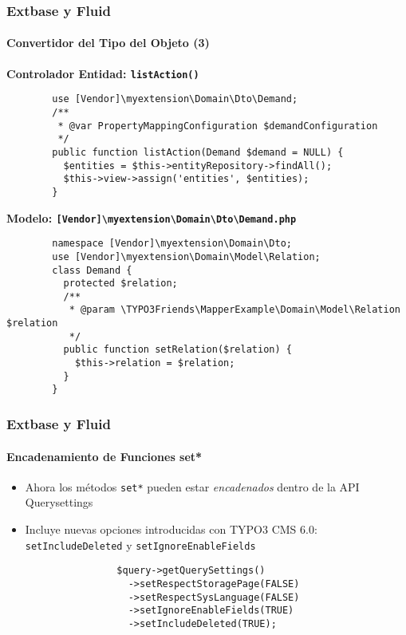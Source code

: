 \begin{frame}[fragile]
	\frametitle{Extbase y Fluid}
	\framesubtitle{Convertidor del Tipo del Objeto (3)}

	\lstset{
		basicstyle=\tiny\ttfamily
	}

	\smaller\textbf{Controlador Entidad: \texttt{listAction()}}\normalsize
	\begin{lstlisting}
		use [Vendor]\myextension\Domain\Dto\Demand;
		/**
		 * @var PropertyMappingConfiguration $demandConfiguration
		 */
		public function listAction(Demand $demand = NULL) {
		  $entities = $this->entityRepository->findAll();
		  $this->view->assign('entities', $entities);
		}
	\end{lstlisting}

	\smaller\textbf{Modelo: \texttt{[Vendor]\textbackslash myextension\textbackslash Domain\textbackslash Dto\textbackslash Demand.php}}\normalsize
	\begin{lstlisting}
		namespace [Vendor]\myextension\Domain\Dto;
		use [Vendor]\myextension\Domain\Model\Relation;
		class Demand {
		  protected $relation;
		  /**
		   * @param \TYPO3Friends\MapperExample\Domain\Model\Relation $relation
		   */
		  public function setRelation($relation) {
		    $this->relation = $relation;
		  }
		}
	\end{lstlisting}

\end{frame}


\begin{frame}[fragile]
	\frametitle{Extbase y Fluid}
	\framesubtitle{Encadenamiento de Funciones set* }

	\lstset{
		basicstyle=\tiny\ttfamily
	}

	\begin{itemize}
		\item Ahora los métodos \texttt{set*} pueden estar \emph{encadenados} dentro de la API Querysettings
		\item Incluye nuevas opciones introducidas con TYPO3 CMS 6.0:\newline
			\texttt{setIncludeDeleted} y \texttt{setIgnoreEnableFields}

			\begin{lstlisting}
				$query->getQuerySettings()
				  ->setRespectStoragePage(FALSE)
				  ->setRespectSysLanguage(FALSE)
				  ->setIgnoreEnableFields(TRUE)
				  ->setIncludeDeleted(TRUE);
			\end{lstlisting}
	\end{itemize}

\end{frame}

